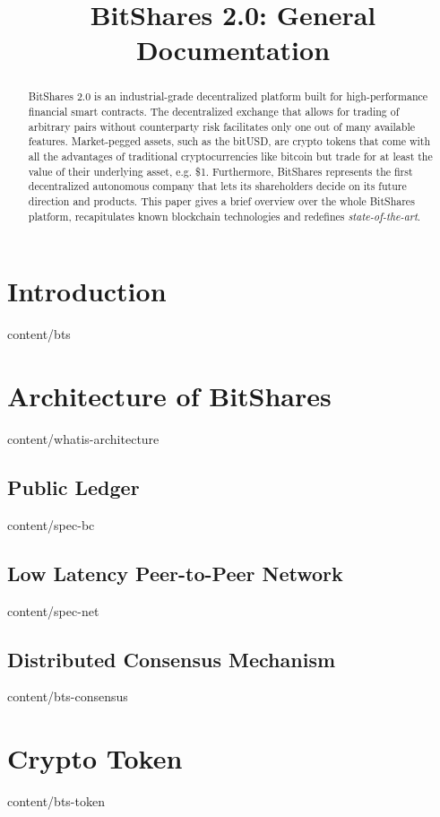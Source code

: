 \documentclass{btswhitepaper}
\title{BitShares 2.0: General Documentation}
\begin{document}
\sloppy
\maketitle

\begin{abstract}%
 BitShares 2.0 is an industrial-grade decentralized platform built for
 high-performance financial smart contracts. The decentralized exchange that
 allows for trading of arbitrary pairs without counterparty risk facilitates
 only one out of many available features. Market-pegged assets, such as the
 bitUSD, are crypto tokens that come with all the advantages of traditional
 cryptocurrencies like bitcoin but trade for at least the value of their
 underlying asset, e.g. \$1. Furthermore, BitShares represents the first
 decentralized autonomous company that lets its shareholders decide on its
 future direction and products. This paper gives a brief overview over the
 whole BitShares platform, recapitulates known blockchain technologies and
 redefines \emph{state-of-the-art}.
\end{abstract}

\section       { Introduction                      }  { content/bts                 } 

\section       { Architecture of BitShares         }  { content/whatis-architecture } 
\subsection    { Public Ledger                     }  { content/spec-bc             } 
\subsection    { Low Latency Peer-to-Peer Network  }  { content/spec-net            } 
\subsection    { Distributed Consensus Mechanism   }  { content/bts-consensus       } 

\section       { Crypto Token                      }  { content/bts-token           } 
\end{document}
